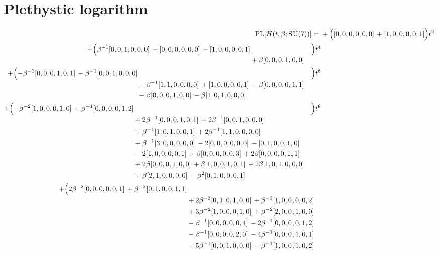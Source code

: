 \documentclass[10pt]{article}
\begin{document}
\section{Plethystic logarithm}
\[
\begin{aligned}
\operatorname{PL}[H(t,\beta;\mathrm{SU}(7))] ={}&
  + \Bigl([0,0,0,0,0,0]\,+[1,0,0,0,0,1]\Bigr)t^{2} \\
  + \Bigl(\begin{aligned}[t]\beta^{-1}[0,0,1,0,0,0]\,-[0,0,0,0,0,0]\,-[1,0,0,0,0,1] \\
  &{}+\beta[0,0,0,1,0,0]\end{aligned}\Bigr)t^{4} \\
  + \Bigl(\begin{aligned}[t]-\beta^{-1}[0,0,0,1,0,1]\,-\beta^{-1}[0,0,1,0,0,0] \\
  &{}-\beta^{-1}[1,1,0,0,0,0]\,+[1,0,0,0,0,1]\,-\beta[0,0,0,0,1,1] \\
  &{}-\beta[0,0,0,1,0,0]\,-\beta[1,0,1,0,0,0]\end{aligned}\Bigr)t^{6} \\
  + \Bigl(\begin{aligned}[t]-\beta^{-2}[1,0,0,0,1,0]\,+\beta^{-1}[0,0,0,0,1,2] \\
  &{}+2\beta^{-1}[0,0,0,1,0,1]\,+2\beta^{-1}[0,0,1,0,0,0] \\
  &{}+\beta^{-1}[1,0,1,0,0,1]\,+2\beta^{-1}[1,1,0,0,0,0] \\
  &{}+\beta^{-1}[3,0,0,0,0,0]\,-2[0,0,0,0,0,0]\,-[0,1,0,0,1,0] \\
  &{}-2[1,0,0,0,0,1]\,+\beta[0,0,0,0,0,3]\,+2\beta[0,0,0,0,1,1] \\
  &{}+2\beta[0,0,0,1,0,0]\,+\beta[1,0,0,1,0,1]\,+2\beta[1,0,1,0,0,0] \\
  &{}+\beta[2,1,0,0,0,0]\,-\beta^{2}[0,1,0,0,0,1]\end{aligned}\Bigr)t^{8} \\
  + \Bigl(\begin{aligned}[t]2\beta^{-2}[0,0,0,0,0,1]\,+\beta^{-2}[0,1,0,0,1,1] \\
  &{}+2\beta^{-2}[0,1,0,1,0,0]\,+\beta^{-2}[1,0,0,0,0,2] \\
  &{}+3\beta^{-2}[1,0,0,0,1,0]\,+\beta^{-2}[2,0,0,1,0,0] \\
  &{}-\beta^{-1}[0,0,0,0,0,4]\,-2\beta^{-1}[0,0,0,0,1,2] \\
  &{}-\beta^{-1}[0,0,0,0,2,0]\,-4\beta^{-1}[0,0,0,1,0,1] \\
  &{}-5\beta^{-1}[0,0,1,0,0,0]\,-\beta^{-1}[1,0,0,1,0,2] \\

\end{aligned}
\end{aligned}\]
\end{document}
